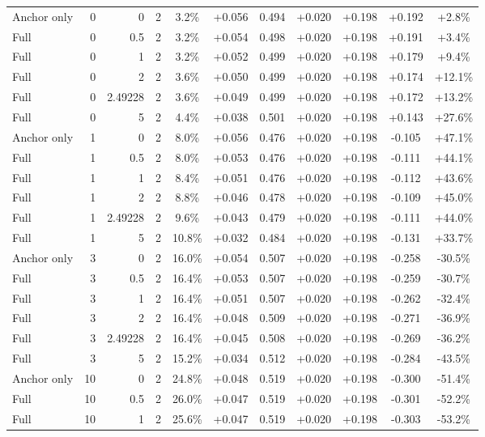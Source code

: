 \begin{table}[htbp]
\begin{tabular}{lrrrccccccc}
Anchor only & 0 & 0 & 2 & 3.2\% & +0.056 & 0.494 & +0.020 & +0.198 & +0.192 & +2.8\% \\
Full & 0 & 0.5 & 2 & 3.2\% & +0.054 & 0.498 & +0.020 & +0.198 & +0.191 & +3.4\% \\
Full & 0 & 1 & 2 & 3.2\% & +0.052 & 0.499 & +0.020 & +0.198 & +0.179 & +9.4\% \\
Full & 0 & 2 & 2 & 3.6\% & +0.050 & 0.499 & +0.020 & +0.198 & +0.174 & +12.1\% \\
Full & 0 & 2.49228 & 2 & 3.6\% & +0.049 & 0.499 & +0.020 & +0.198 & +0.172 & +13.2\% \\
Full & 0 & 5 & 2 & 4.4\% & +0.038 & 0.501 & +0.020 & +0.198 & +0.143 & +27.6\% \\
Anchor only & 1 & 0 & 2 & 8.0\% & +0.056 & 0.476 & +0.020 & +0.198 & -0.105 & +47.1\% \\
Full & 1 & 0.5 & 2 & 8.0\% & +0.053 & 0.476 & +0.020 & +0.198 & -0.111 & +44.1\% \\
Full & 1 & 1 & 2 & 8.4\% & +0.051 & 0.476 & +0.020 & +0.198 & -0.112 & +43.6\% \\
Full & 1 & 2 & 2 & 8.8\% & +0.046 & 0.478 & +0.020 & +0.198 & -0.109 & +45.0\% \\
Full & 1 & 2.49228 & 2 & 9.6\% & +0.043 & 0.479 & +0.020 & +0.198 & -0.111 & +44.0\% \\
Full & 1 & 5 & 2 & 10.8\% & +0.032 & 0.484 & +0.020 & +0.198 & -0.131 & +33.7\% \\
Anchor only & 3 & 0 & 2 & 16.0\% & +0.054 & 0.507 & +0.020 & +0.198 & -0.258 & -30.5\% \\
Full & 3 & 0.5 & 2 & 16.4\% & +0.053 & 0.507 & +0.020 & +0.198 & -0.259 & -30.7\% \\
Full & 3 & 1 & 2 & 16.4\% & +0.051 & 0.507 & +0.020 & +0.198 & -0.262 & -32.4\% \\
Full & 3 & 2 & 2 & 16.4\% & +0.048 & 0.509 & +0.020 & +0.198 & -0.271 & -36.9\% \\
Full & 3 & 2.49228 & 2 & 16.4\% & +0.045 & 0.508 & +0.020 & +0.198 & -0.269 & -36.2\% \\
Full & 3 & 5 & 2 & 15.2\% & +0.034 & 0.512 & +0.020 & +0.198 & -0.284 & -43.5\% \\
Anchor only & 10 & 0 & 2 & 24.8\% & +0.048 & 0.519 & +0.020 & +0.198 & -0.300 & -51.4\% \\
Full & 10 & 0.5 & 2 & 26.0\% & +0.047 & 0.519 & +0.020 & +0.198 & -0.301 & -52.2\% \\
Full & 10 & 1 & 2 & 25.6\% & +0.047 & 0.519 & +0.020 & +0.198 & -0.303 & -53.2\% \\

\end{tabular}
\end{table}

